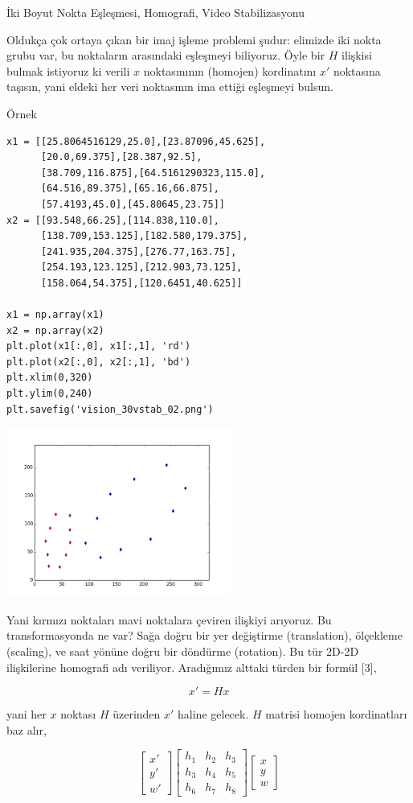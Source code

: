 \documentclass[12pt,fleqn]{article}\usepackage{../../common}
\begin{document}
İki Boyut Nokta Eşleşmesi, Homografi, Video Stabilizasyonu

Oldukça çok ortaya çıkan bir imaj işleme problemi şudur: elimizde iki nokta
grubu var, bu noktaların arasındaki eşleşmeyi biliyoruz. Öyle bir $H$
ilişkisi bulmak istiyoruz ki verili $x$ noktasınının (homojen) kordinatını
$x'$ noktasına taşısın, yani eldeki her veri noktasının ima ettiği eşleşmeyi
bulsun. 

Örnek

\begin{verbatim}
x1 = [[25.8064516129,25.0],[23.87096,45.625],
      [20.0,69.375],[28.387,92.5],
      [38.709,116.875],[64.5161290323,115.0],
      [64.516,89.375],[65.16,66.875],
      [57.4193,45.0],[45.80645,23.75]]
x2 = [[93.548,66.25],[114.838,110.0],
      [138.709,153.125],[182.580,179.375],
      [241.935,204.375],[276.77,163.75],
      [254.193,123.125],[212.903,73.125],
      [158.064,54.375],[120.6451,40.625]]

x1 = np.array(x1)
x2 = np.array(x2)
plt.plot(x1[:,0], x1[:,1], 'rd')
plt.plot(x2[:,0], x2[:,1], 'bd')
plt.xlim(0,320)
plt.ylim(0,240)
plt.savefig('vision_30vstab_02.png')
\end{verbatim}

\includegraphics[width=20em]{vision_30vstab_02.png}

Yani kırmızı noktaları mavi noktalara çeviren ilişkiyi arıyoruz. Bu
transformasyonda ne var? Sağa doğru bir yer değiştirme (translation),
ölçekleme (scaling), ve saat yönüne doğru bir döndürme (rotation). Bu tür
2D-2D ilişkilerine homografi adı veriliyor. Aradığımız alttaki türden bir
formül [3],

$$ x' = H x$$

yani her $x$ noktası $H$ üzerinden $x'$ haline gelecek. $H$ matrisi homojen
kordinatları baz alır,

$$ 
\left[\begin{array}{r} x' \\ y' \\ w' \end{array}\right]
\left[\begin{array}{rrr}
h_1 & h_2 & h_3 \\ h_3 & h_4 & h_5 \\ h_6 & h_7 & h_8 
\end{array}\right]
\left[\begin{array}{r} x \\ y \\ w \end{array}\right]
$$
\end{document}
